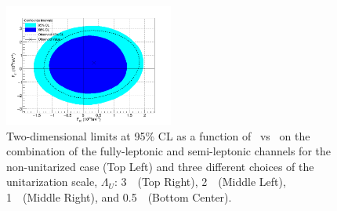 \begin{figure}[h!]
\begin{center}
\includegraphics[width=0.495\textwidth]{figures/combination/CombUnit-Lim.png}
\end{center}
\caption{Two-dimensional limits at 95\% CL as a function of \fszero~vs \fsone~on the combination of the fully-leptonic and semi-leptonic channels for the non-unitarized case (Top Left)
and three different choices of the unitarization scale, $\Lambda_U$:
3~\TeV~(Top Right), 2~\TeV~(Middle Left), 1~\TeV~(Middle Right), and 0.5~\TeV~(Bottom Center).}

 \label{fig:aqgc_combined_2d}
 \end{figure}



